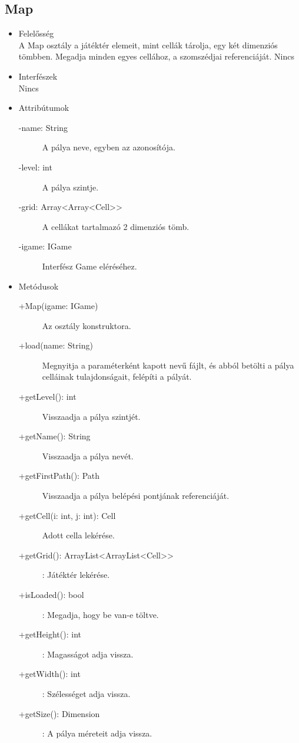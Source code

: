 \subsection{Map}
\begin{itemize}
\item Felelősség\\
A Map osztály a játéktér elemeit, mint cellák tárolja, egy két dimenziós tömbben. Megadja minden egyes cellához, a szomszédjai referenciáját. 
Nincs
\item Interfészek\\
Nincs
\item Attribútumok
	\begin{description}
		\item[-name: String] A pálya neve, egyben az azonosítója. 
		\item[-level: int] A pálya szintje. 
		\item[-grid: Array<Array<Cell>>] A cellákat tartalmazó 2 dimenziós tömb. 
		\item[-igame: IGame] Interfész Game eléréséhez.

		
	\end{description}
\item Metódusok
	\begin{description}
		
		\item[+Map(igame: IGame)] Az osztály konstruktora. 
\item[+load(name: String)] Megnyitja a paraméterként kapott nevű fájlt, és abból betölti a pálya celláinak tulajdonságait, felépíti a pályát. 
\item[+getLevel(): int] Visszaadja a pálya szintjét. 
\item[+getName(): String] Visszaadja a pálya nevét. 
\item[+getFirstPath(): Path] Visszaadja a pálya belépési pontjának referenciáját. 
\item[+getCell(i: int, j: int): Cell] Adott cella lekérése.
\item[+getGrid(): ArrayList<ArrayList<Cell>>]: Játéktér lekérése.
\item[+isLoaded(): bool]: Megadja, hogy be van-e töltve.
\item[+getHeight(): int]: Magasságot adja vissza.
\item[+getWidth(): int]: Szélességet adja vissza.
\item[+getSize(): Dimension]: A pálya méreteit adja vissza.


		
		
	\end{description}
\end{itemize}

